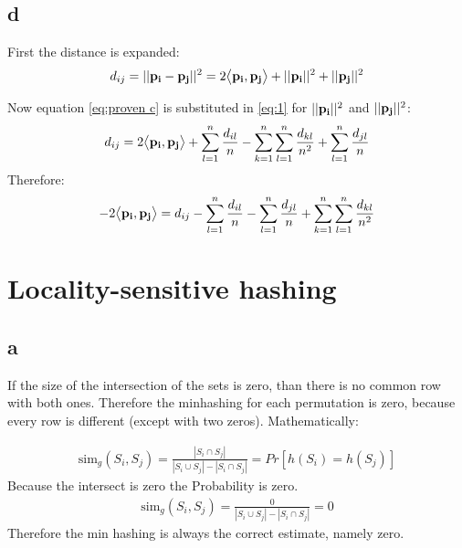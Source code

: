 \documentclass[a4paper,12pt]{article}
\begin{document}
\subsection{d}
First the distance is expanded:
\begin{equation}
\begin{aligned}
d_{ij}=||{\bf p_i-p_j}||^2=2\big \langle{\bf p_i,p_j}\big \rangle+||{\bf p_i}||^2+||{\bf p_j}||^2
\end{aligned}
\label{eq:1}
\end{equation}

Now equation \ref{eq:proven c} is substituted in \ref{eq:1} for $||{\bf p_i}||^2$ and $||{\bf p_j}||^2$:
\begin{equation}
\begin{aligned}
d_{ij}=2\big \langle{\bf p_i,p_j}\big \rangle+\sum_{l=1}^n \frac{d_{il}}{n}-\sum^{n}_{k=1}\sum_{l=1}^n\frac{d_{kl}}{n^2}+\sum_{l=1}^n \frac{d_{jl}}{n}
\end{aligned}
\label{eq:2}
\end{equation}
Therefore:
\begin{equation}
\begin{aligned}
-2\big \langle{\bf p_i,p_j}\big \rangle=d_{ij}-\sum_{l=1}^n \frac{d_{il}}{n}-\sum_{l=1}^n \frac{d_{jl}}{n}+\sum^{n}_{k=1}\sum_{l=1}^n\frac{d_{kl}}{n^2}
\end{aligned}
\label{eq:3}
\end{equation}

\section{Locality-sensitive hashing}

\subsection{a}
If the size of the intersection of the sets is zero, than there is no common row with both ones. Therefore the minhashing for each permutation is zero, because every row is different (except with two zeros). Mathematically:

\begin{equation}
\begin{aligned}
\text{sim}_g(S_i,S_j)=\frac{|S_i \cap S_j|}{|S_i \cup S_j|-|S_i \cap S_j|}=Pr[h(S_i)=h(S_j)]
\end{aligned}
\end{equation}
Because the intersect is zero the Probability is zero. 
\begin{equation}
\begin{aligned}
\text{sim}_g(S_i,S_j)=\frac{0}{|S_i \cup S_j|-|S_i \cap S_j|}=0
\end{aligned}
\end{equation}
Therefore the min hashing is always the correct estimate, namely zero. 
 
\end{document}
